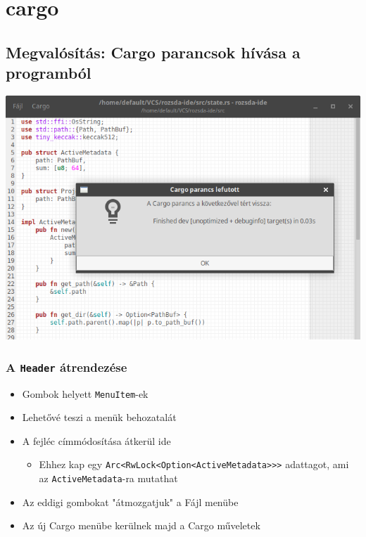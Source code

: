 \documentclass{beamer}
\begin{document}
    \section[Cargo parancsok]{cargo}
    \subsection{Megvalósítás: Cargo parancsok hívása a programból}

    \begin{frame}[fragile]
        \begin{center}
            \includegraphics[scale=0.3]{kepek/cargo.png}
        \end{center}
    \end{frame}

    \begin{frame}[fragile]
        \frametitle{A \texttt{Header} átrendezése}

        \begin{itemize}
            \item Gombok helyett \texttt{MenuItem}-ek
            \item Lehetővé teszi a menük behozatalát
            \item A fejléc címmódosítása átkerül ide \begin{itemize}
                \item Ehhez kap egy \texttt{Arc<RwLock<Option<ActiveMetadata>{}>{}>} adattagot, ami az \texttt{ActiveMetadata}-ra mutathat
            \end{itemize}
            \item Az eddigi gombokat "átmozgatjuk" a Fájl menübe
            \item Az új Cargo menübe kerülnek majd a Cargo műveletek
        \end{itemize}
    \end{frame}
\end{document}
